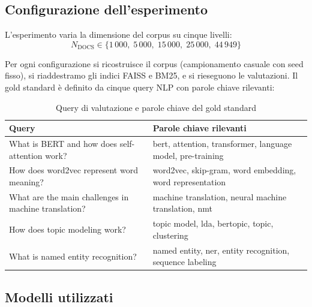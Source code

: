 \documentclass[12pt,a4paper]{article}
\begin{document}
\subsection{Configurazione dell'esperimento}

L'esperimento varia la dimensione del corpus su cinque livelli:
\[
  N_{\text{DOCS}} \in \{1\,000,\; 5\,000,\; 15\,000,\; 25\,000,\; 44\,949\}
\]

Per ogni configurazione si ricostruisce il corpus (campionamento casuale con seed fisso), si riaddestramo gli indici FAISS e BM25, e si rieseguono le valutazioni. Il gold standard \`e definito da cinque query NLP con parole chiave rilevanti:

\begin{table}[H]
  \centering
  \caption{Query di valutazione e parole chiave del gold standard}
  \begin{tabular}{p{7cm} p{7cm}}
    \toprule
    \textbf{Query} & \textbf{Parole chiave rilevanti} \\
    \midrule
    What is BERT and how does self-attention work? & bert, attention, transformer, language model, pre-training \\
    How does word2vec represent word meaning?       & word2vec, skip-gram, word embedding, word representation \\
    What are the main challenges in machine translation? & machine translation, neural machine translation, nmt \\
    How does topic modeling work?                  & topic model, lda, bertopic, topic, clustering \\
    What is named entity recognition?              & named entity, ner, entity recognition, sequence labeling \\
    \bottomrule
  \end{tabular}
\end{table}

\subsection{Modelli utilizzati}
\end{document}
